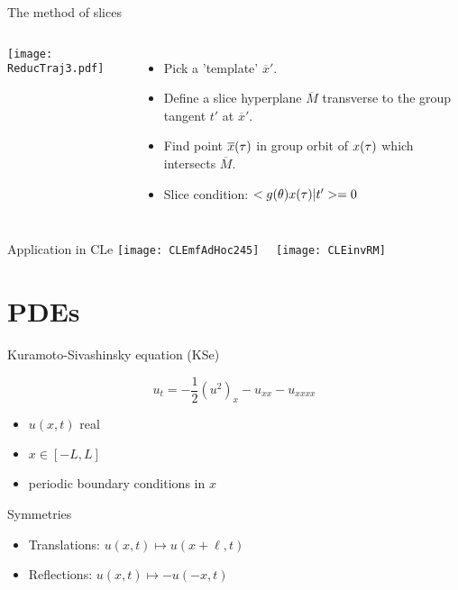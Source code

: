 \begin{frame}[t]{The method of slices}
 \begin{block}{}
  \begin{columns}
	  \texttt{[image: ReducTraj3.pdf]}
	\begin{itemize}
	  \item Pick a 'template' $\overline{x}'$.
	  \item Define a slice hyperplane $\overline{M}$ transverse to the group tangent $t'$ at $\overline{x}'$.
	  \item Find point $\overline{x}(\tau)$ in group orbit of $x(\tau)$ which intersects $\overline{M}$.
	  \item Slice condition: $<g(\theta)x(\tau)|t'>=0$
	\end{itemize}
  \end{columns}
 \end{block}
\end{frame}

\begin{frame}{Application in CLe}
 \centering
  \texttt{[image: CLEmfAdHoc245]}~~
  \texttt{[image: CLEinvRM]}
\end{frame}

\section{PDEs}

\begin{frame}{Kuramoto-Sivashinsky equation (KSe)}
 \begin{block}{}
  \[
	u_t =  -{\textstyle\frac{1}{2}}(u^2)_x-u_{xx}-u_{xxxx}
  \]
  \begin{itemize}
    \item $u(x,t)$ real
	\item $x\in[-L,L]$
	\item periodic boundary conditions in $x$
  \end{itemize}
 \end{block}
  \begin{block}{Symmetries}
    \begin{itemize}
	  \item Translations: $u(x,t) \mapsto u(x+\ell,t)$
	  \item Reflections: $u(x,t) \mapsto -u(-x,t)$
    \end{itemize}

  \end{block}
\end{frame}

